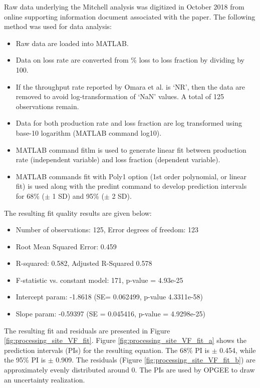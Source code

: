 \documentclass[11pt]{report}
\newcommand{\prm}[1]{\textsf{#1}}
\begin{document}
{{{{Raw data underlying the Mitchell analysis was digitized in October 2018 from online supporting information document associated with the paper. The following method was used for data analysis:
\begin{itemize}
\item Raw data are loaded into MATLAB.
\item Data on loss rate are converted from \% loss to loss fraction by dividing by 100.
\item If the throughput rate reported by Omara et al. is `NR', then the data are removed to avoid log-transformation of `NaN' values. A total of 125 observations remain. 
\item Data for both production rate and loss fraction are log transformed using base-10 logarithm (MATLAB command \prm{log10}).
\item MATLAB command \prm{fitlm} is used to generate linear fit between production rate (independent variable) and loss fraction (dependent variable). 
\item MATLAB commands \prm{fit} with \prm{Poly1} option (1st order polynomial, or linear fit) is used along with the \prm{predint} command to develop prediction intervals for 68\% ($\pm$ 1 SD) and 95\% ($\pm$ 2 SD).
\end{itemize} 

The resulting fit quality results are given below:
\begin{itemize}
\item Number of observations: 125, Error degrees of freedom: 123
\item Root Mean Squared Error: 0.459
\item R-squared: 0.582,  Adjusted R-Squared 0.578
\item F-statistic vs. constant model: 171, p-value = 4.93e-25
\item Intercept param: -1.8618   (SE= 0.062499, p-value 4.3311e-58)
\item Slope param: -0.59397    (SE = 0.045416, p-value = 4.9298e-25)
\end{itemize}

The resulting fit and residuals are presented in Figure \ref{fig:processing_site_VF_fit}. Figure \ref{fig:processing_site_VF_fit_a} shows the prediction intervals (PIs) for the resulting equation. The 68\% PI is $\pm$ 0.454, while the 95\% PI is $\pm$ 0.909. The residuals (Figure \ref{fig:processing_site_VF_fit_b}) are approximately evenly distributed around 0. The PIs are used by OPGEE to draw an uncertainty realization.

}}}}
\end{document}
